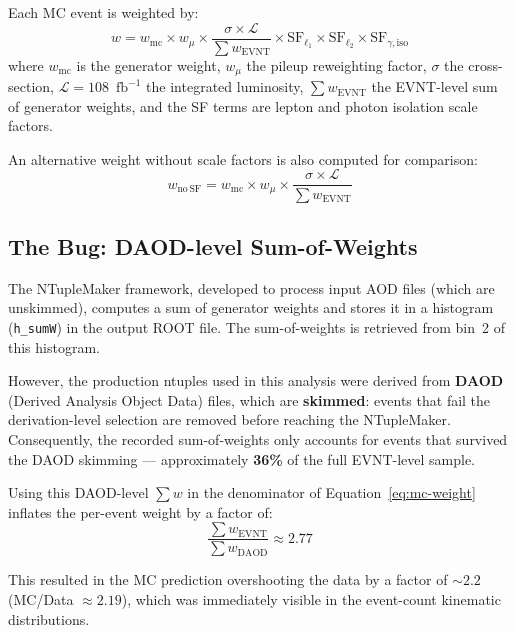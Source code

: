 \documentclass[11pt,a4paper]{article}
\newcommand{\fbinv}{\ensuremath{\text{fb}^{-1}}\xspace}
\begin{document}
Each MC event is weighted by:
\begin{equation}
w = w_{\mathrm{mc}} \times w_{\mu} \times \frac{\sigma \times \mathcal{L}}{\sum w_{\mathrm{EVNT}}} \times \mathrm{SF}_{\ell_1} \times \mathrm{SF}_{\ell_2} \times \mathrm{SF}_{\gamma,\mathrm{iso}}
\label{eq:mc-weight}
\end{equation}
where $w_{\mathrm{mc}}$ is the generator weight, $w_{\mu}$ the pileup
reweighting factor, $\sigma$ the cross-section, $\mathcal{L} = 108$~\fbinv
the integrated luminosity, $\sum w_{\mathrm{EVNT}}$ the EVNT-level
sum of generator weights, and the SF terms are lepton and photon isolation
scale factors.

An alternative weight without scale factors is also computed for comparison:
\begin{equation}
w_{\mathrm{no\,SF}} = w_{\mathrm{mc}} \times w_{\mu} \times \frac{\sigma \times \mathcal{L}}{\sum w_{\mathrm{EVNT}}}
\end{equation}

\subsection{The Bug: DAOD-level Sum-of-Weights}
\label{sec:bug}

The NTupleMaker framework, developed to process input AOD files (which are
unskimmed), computes a sum of generator weights and stores it in a histogram
(\texttt{h\_sumW}) in the output ROOT file.  The sum-of-weights is retrieved
from bin~2 of this histogram.

However, the production ntuples used in this analysis were derived from
\textbf{DAOD} (Derived Analysis Object Data) files, which are \textbf{skimmed}:
events that fail the derivation-level selection are removed before reaching
the NTupleMaker.  Consequently, the recorded sum-of-weights only accounts
for events that survived the DAOD skimming --- approximately \textbf{36\%}
of the full EVNT-level sample.

Using this DAOD-level $\sum w$ in the denominator of Equation~\ref{eq:mc-weight}
inflates the per-event weight by a factor of:
\begin{equation}
\frac{\sum w_{\mathrm{EVNT}}}{\sum w_{\mathrm{DAOD}}} \approx 2.77
\end{equation}

This resulted in the MC prediction overshooting the data by a factor of
${\sim}2.2$ (MC/Data $\approx 2.19$), which was immediately visible in the
event-count kinematic distributions.
\end{document}
